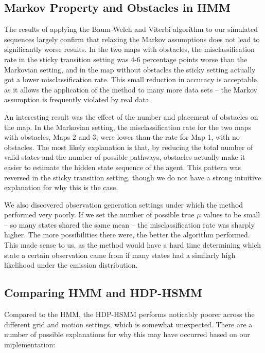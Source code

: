 \documentclass{article}
\begin{document}
\subsection{Markov Property and Obstacles in HMM}

The results of applying the Baum-Welch and Viterbi algorithm to our simulated sequences largely confirm that relaxing the Markov assumptions does not lead to significantly worse results. In the two maps with obstacles, the misclassification rate in the sticky transition setting was 4-6 percentage points worse than the Markovian setting, and in the map without obstacles the sticky setting actually got a lower misclassification rate. This small reduction in accuracy is acceptable, as it allows the application of the method to many more data sets -- the Markov assumption is frequently violated by real data.

An interesting result was the effect of the number and placement of obstacles on the map. In the Markovian setting, the misclassification rate for the two maps with obstacles, Maps 2 and 3, were lower than the rate for Map 1, with no obstacles. The most likely explanation is that, by reducing the total number of valid states and the number of possible pathways, obstacles actually make it easier to estimate the hidden state sequence of the agent. This pattern was reversed in the sticky transition setting, though we do not have a strong intuitive explanation for why this is the case.

We also discovered observation generation settings under which the method performed very poorly. If we set the number of possible true $\mu$ values to be small -- so many states shared the same mean -- the misclassification rate was sharply higher. The more possibilities there were, the better the algorithm performed. This made sense to us, as the method would have a hard time determining which state a certain observation came from if many states had a similarly high likelihood under the emission distribution.

\subsection{Comparing HMM and HDP-HSMM}

Compared to the HMM, the HDP-HSMM performs noticably poorer across the different grid and motion settings, which is somewhat unexpected. There are a number of possible explanations for why this may have occurred based on our implementation:
\end{document}

